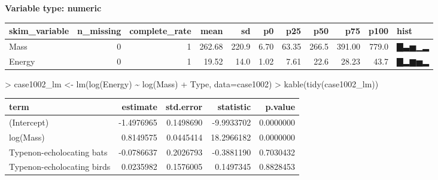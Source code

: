 \documentclass[
]{article}
\newenvironment{Shaded}{\begin{snugshade}}{\end{snugshade}}
\newcommand{\AttributeTok}[1]{\textcolor[rgb]{0.77,0.63,0.00}{#1}}
\newcommand{\FunctionTok}[1]{\textcolor[rgb]{0.00,0.00,0.00}{#1}}
\newcommand{\NormalTok}[1]{#1}
\newcommand{\OtherTok}[1]{\textcolor[rgb]{0.56,0.35,0.01}{#1}}
\newcommand{\SpecialCharTok}[1]{\textcolor[rgb]{0.00,0.00,0.00}{#1}}
\begin{document}
\textbf{Variable type: numeric}

\begin{longtable}[]{@{}lrrrrrrrrrl@{}}
\toprule
skim\_variable & n\_missing & complete\_rate & mean & sd & p0 & p25 &
p50 & p75 & p100 & hist \\
\midrule
\endhead
Mass & 0 & 1 & 262.68 & 220.9 & 6.70 & 63.35 & 266.5 & 391.00 & 779.0 &
▇▃▅▁▂ \\
Energy & 0 & 1 & 19.52 & 14.0 & 1.02 & 7.61 & 22.6 & 28.23 & 43.7 &
▇▂▆▅▂ \\
\bottomrule
\end{longtable}

\begin{Shaded}
\begin{Highlighting}[]
\SpecialCharTok{\textgreater{}}\NormalTok{ case1002\_lm }\OtherTok{\textless{}{-}} \FunctionTok{lm}\NormalTok{(}\FunctionTok{log}\NormalTok{(Energy) }\SpecialCharTok{\textasciitilde{}} \FunctionTok{log}\NormalTok{(Mass) }\SpecialCharTok{+}\NormalTok{ Type, }\AttributeTok{data=}\NormalTok{case1002)}
\SpecialCharTok{\textgreater{}} \FunctionTok{kable}\NormalTok{(}\FunctionTok{tidy}\NormalTok{(case1002\_lm))}
\end{Highlighting}
\end{Shaded}

\begin{longtable}[]{@{}lrrrr@{}}
\toprule
term & estimate & std.error & statistic & p.value \\
\midrule
\endhead
(Intercept) & -1.4976965 & 0.1498690 & -9.9933702 & 0.0000000 \\
log(Mass) & 0.8149575 & 0.0445414 & 18.2966182 & 0.0000000 \\
Typenon-echolocating bats & -0.0786637 & 0.2026793 & -0.3881190 &
0.7030432 \\
Typenon-echolocating birds & 0.0235982 & 0.1576005 & 0.1497345 &
0.8828453 \\
\bottomrule
\end{longtable}
\end{document}
